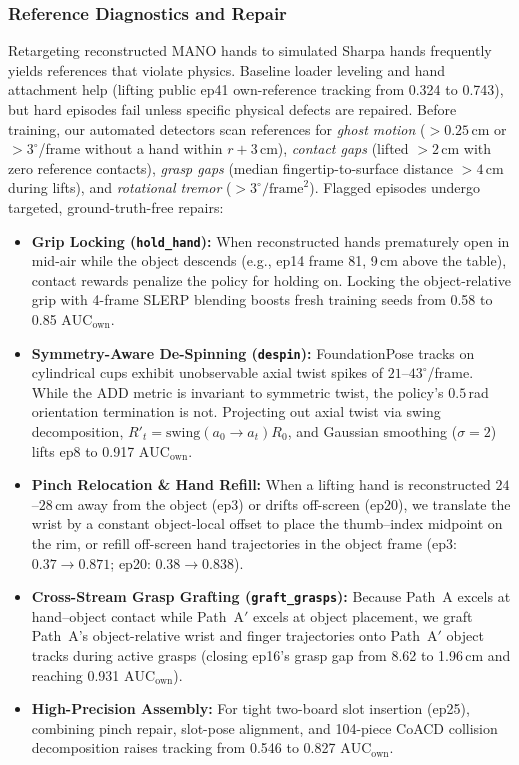 \documentclass[10pt]{nvidiaextabstract}
\newcommand{\ownauc}{\ensuremath{\mathrm{AUC}_{\text{own}}}\xspace}
\begin{document}
\subsubsection{Reference Diagnostics and Repair}
\label{app:detail-repair}
Retargeting reconstructed MANO hands to simulated Sharpa hands frequently yields references that violate physics. Baseline loader leveling and hand attachment help (lifting public ep41 own-reference tracking from 0.324 to 0.743), but hard episodes fail unless specific physical defects are repaired. Before training, our automated detectors scan references for \emph{ghost motion} ($>0.25$\,cm or $>3^\circ$/frame without a hand within $r+3$\,cm), \emph{contact gaps} (lifted $>2$\,cm with zero reference contacts), \emph{grasp gaps} (median fingertip-to-surface distance $>4$\,cm during lifts), and \emph{rotational tremor} ($>3^\circ/\text{frame}^2$). Flagged episodes undergo targeted, ground-truth-free repairs:
\begin{itemize}\setlength{\itemsep}{1pt}\setlength{\parskip}{0pt}
  \item \textbf{Grip Locking (\texttt{hold\_hand}):} When reconstructed hands prematurely open in mid-air while the object descends (e.g., ep14 frame 81, 9\,cm above the table), contact rewards penalize the policy for holding on. Locking the object-relative grip with 4-frame SLERP blending boosts fresh training seeds from 0.58 to 0.85 \ownauc.
  \item \textbf{Symmetry-Aware De-Spinning (\texttt{despin}):} FoundationPose tracks on cylindrical cups exhibit unobservable axial twist spikes of $21$--$43^\circ$/frame. While the ADD metric is invariant to symmetric twist, the policy's $0.5$\,rad orientation termination is not. Projecting out axial twist via swing decomposition, $R'_t = \mathrm{swing}(a_0 \rightarrow a_t)R_0$, and Gaussian smoothing ($\sigma=2$) lifts ep8 to 0.917 \ownauc.
  \item \textbf{Pinch Relocation \& Hand Refill:} When a lifting hand is reconstructed $24$--$28$\,cm away from the object (ep3) or drifts off-screen (ep20), we translate the wrist by a constant object-local offset to place the thumb--index midpoint on the rim, or refill off-screen hand trajectories in the object frame (ep3: $0.37 \rightarrow 0.871$; ep20: $0.38 \rightarrow 0.838$).
  \item \textbf{Cross-Stream Grasp Grafting (\texttt{graft\_grasps}):} Because Path~A excels at hand--object contact while Path~A$'$ excels at object placement, we graft Path~A's object-relative wrist and finger trajectories onto Path~A$'$ object tracks during active grasps (closing ep16's grasp gap from 8.62 to 1.96\,cm and reaching 0.931 \ownauc).
  \item \textbf{High-Precision Assembly:} For tight two-board slot insertion (ep25), combining pinch repair, slot-pose alignment, and 104-piece CoACD collision decomposition raises tracking from 0.546 to 0.827 \ownauc.
\end{itemize}
\end{document}
